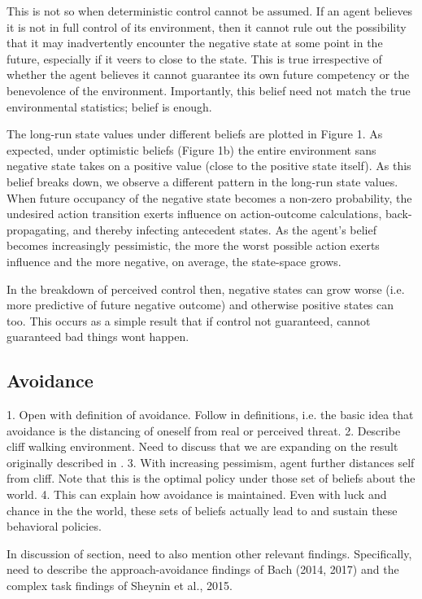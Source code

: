 \documentclass[11pt]{article} %
\begin{document}
This is not so when deterministic control cannot be assumed. If an agent believes
it is not in full control of its environment, then it cannot rule out the possibility
that it may inadvertently encounter the negative state at some point in the future,
especially if it veers to close to the state. This is true irrespective of whether
the agent believes it cannot guarantee its own future competency or the benevolence
of the environment. Importantly, this belief need not match the true environmental
statistics; belief is enough.

The long-run state values under different beliefs are plotted in Figure 1. As
expected, under optimistic beliefs (Figure 1b) the entire environment sans negative
state takes on a positive value (close to the positive state itself). As this belief
breaks down, we observe a different pattern in the long-run state values. When
future occupancy of the negative state becomes a non-zero probability, the undesired
action transition exerts influence on action-outcome calculations, back-propagating,
and thereby infecting antecedent states. As the agent's belief becomes increasingly
pessimistic, the more the worst possible action exerts influence and the more
negative, on average, the state-space grows.

In the breakdown of perceived control then, negative states can grow worse (i.e.
more predictive of future negative outcome) and otherwise positive states can too.
This occurs as a simple result that if control not guaranteed, cannot guaranteed
bad things wont happen. 

\subsection{Avoidance}

1. Open with definition of avoidance. Follow \citep{Arnaudova2017} in definitions, i.e.
the basic idea that avoidance is the distancing of oneself from real or perceived
threat.
2. Describe cliff walking environment. Need to discuss that we are expanding
on the result originally described in \citep{Gaskett2003}.
3. With increasing pessimism, agent further distances self from cliff. Note that
this is the optimal policy under those set of beliefs about the world.
4. This can explain how avoidance is maintained. Even with luck and chance in the
the world, these sets of beliefs actually lead to and sustain these behavioral
policies.

In discussion of section, need to also mention other relevant findings. Specifically,
need to describe the approach-avoidance findings of Bach (2014, 2017) and the
complex task findings of Sheynin et al., 2015.
\end{document}
